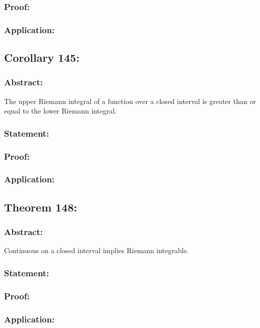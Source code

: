 \documentclass{article}
\begin{document}
\subsubsection*{Proof:}

\subsubsection*{Application:}

\subsection{Corollary 145:}
\subsubsection*{Abstract:}
The upper Riemann integral of a function
over a closed interval is greater than or equal to
the lower Riemann integral.
\subsubsection*{Statement:}

\subsubsection*{Proof:}

\subsubsection*{Application:}

\subsection{Theorem 148:}
\subsubsection*{Abstract:}
Continuous on a closed interval implies Riemann integrable.
\subsubsection*{Statement:}

\subsubsection*{Proof:}

\subsubsection*{Application:}
\newpage{}
\end{document}
